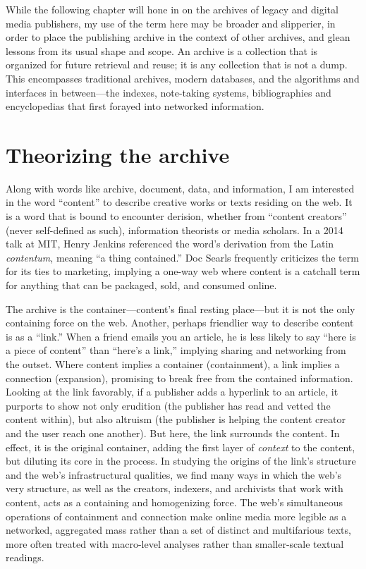 While the following chapter will hone in on the archives of legacy and digital media publishers, my use of the term here may be broader and slipperier, in order to place the publishing archive in the context of other archives, and glean lessons from its usual shape and scope. An archive is a collection that is organized for future retrieval and reuse; it is any collection that is not a dump. This encompasses traditional archives, modern databases, and the algorithms and interfaces in between---the indexes, note-taking systems, bibliographies and encyclopedias that first forayed into networked information.

\section{Theorizing the archive}

Along with words like archive, document, data, and information, I am interested in the word ``content'' to describe creative works or texts residing on the web. It is a word that is bound to encounter derision, whether from ``content creators'' (never self-defined as such), information theorists or media scholars. In a 2014 talk at MIT, Henry Jenkins referenced the word's derivation from the Latin \emph{contentum}, meaning ``a thing contained.''\autocite{jenkins} Doc Searls frequently criticizes the term for its ties to marketing, implying a one-way web where content is a catchall term for anything that can be packaged, sold, and consumed online.\autocite{searls}

The archive is the container---content's final resting place---but it is not the only containing force on the web. Another, perhaps friendlier way to describe content is as a ``link.'' When a friend emails you an article, he is less likely to say ``here is a piece of content'' than ``here's a link,'' implying sharing and networking from the outset. Where content implies a container (containment), a link implies a connection (expansion), promising to break free from the contained information. Looking at the link favorably, if a publisher adds a hyperlink to an article, it purports to show not only erudition (the publisher has read and vetted the content within), but also altruism (the publisher is helping the content creator and the user reach one another). But here, the link surrounds the content. In effect, it is the original container, adding the first layer of \emph{context} to the content, but diluting its core in the process. In studying the origins of the link's structure and the web's infrastructural qualities, we find many ways in which the web's very structure, as well as the creators, indexers, and archivists that work with content, acts as a containing and homogenizing force. The web's simultaneous operations of containment and connection make online media more legible as a networked, aggregated mass rather than a set of distinct and multifarious texts, more often treated with macro-level analyses rather than smaller-scale textual readings.

